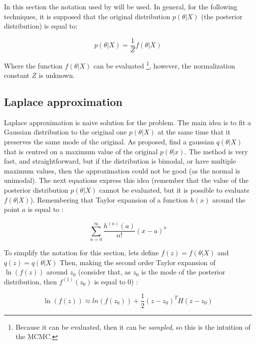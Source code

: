 \documentclass{article}
\begin{document}
In this section the notation used by \cite{bishop2006pattern} will be used. In general, for the following techniques, it is supposed that the original distribution $p(\theta | X)$ (the posterior distribution) is equal to:

\begin{equation}\label{eq:6}
p(\theta | X ) = \frac{1}{Z} f(\theta | X)
\end{equation} 

Where the function $f(\theta | X)$ can be evaluated \footnote{Because it can be evaluated, then it can be \textit{sampled}, so this is the intuition of the MCMC.}, however, the normalization constant $Z$ is unknown. 

\subsection{Laplace approximation}

Laplace approximation is naive solution for the problem. The main idea is to fit a Gaussian distribution to the original one $p(\theta | X)$ at the same time that it preserves the same mode of the original. As \cite{bishop2006pattern} proposed, find a gaussian $q(\theta | X)$ that is centred on a maximum value of the original $p(\theta | x)$. The method is very fast, and straightforward, but if the distribution is bimodal, or have multiple maximum values, then the approximation could not be good (as the normal is unimodal). The next equations express this idea (remember that the value of the posterior distribution $p(\theta | X)$ cannot be evaluated, but it is possible to evaluate $f(\theta | X)$). Remembering that Taylor expansion of a function $h(x)$ around the point $a$ is equal to \cite{bishop2006pattern}:

\begin{equation}
\sum_{n=0}^{\infty} \frac{h^{(n)}(a)}{n!}(x-a)^n
\end{equation}

To simplify the notation for this section, lets define $f(z) = f(\theta | X)$ and $q(z) = q(\theta | X)$ 
Then, making the second order Taylor expansion of $\ln(f(z))$ around $z_{0}$ (consider that, as $z_0$ is the mode of the posterior distribution, then $f^{(1)}(z_0)$ is equal to 0) \cite{bishop2006pattern}:

\begin{equation}
\ln(f(z)) \approx ln(f(z_0)) + \frac{1}{2} (z-z_0)^T H (z-z_0)
\end{equation}
\end{document}
